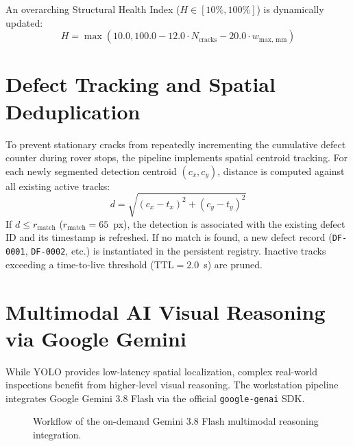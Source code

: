 \documentclass[12pt,a4paper,oneside]{report}
\begin{document}
An overarching Structural Health Index ($H \in [10\%, 100\%]$) is dynamically updated:
\begin{equation}
H = \max\left(10.0, 100.0 - 12.0 \cdot N_{\text{cracks}} - 20.0 \cdot w_{\text{max, mm}}\right)
\end{equation}

\section{Defect Tracking and Spatial Deduplication}
To prevent stationary cracks from repeatedly incrementing the cumulative defect counter during rover stops, the pipeline implements spatial centroid tracking. For each newly segmented detection centroid $(c_x, c_y)$, distance is computed against all existing active tracks:
\begin{equation}
d = \sqrt{(c_x - t_x)^2 + (c_y - t_y)^2}
\end{equation}
If $d \le r_{\text{match}}$ ($r_{\text{match}} = 65$~px), the detection is associated with the existing defect ID and its timestamp is refreshed. If no match is found, a new defect record (\texttt{DF-0001}, \texttt{DF-0002}, etc.) is instantiated in the persistent registry. Inactive tracks exceeding a time-to-live threshold ($\text{TTL} = 2.0$~s) are pruned.

\section{Multimodal AI Visual Reasoning via Google Gemini}
While YOLO provides low-latency spatial localization, complex real-world inspections benefit from higher-level visual reasoning. The workstation pipeline integrates Google Gemini 3.8 Flash via the official \texttt{google-genai} SDK.

\begin{figure}[htbp]
\centering
{}
\caption{Workflow of the on-demand Gemini 3.8 Flash multimodal reasoning integration.}
\label{fig:gemini_workflow}
\end{figure}
\end{document}
